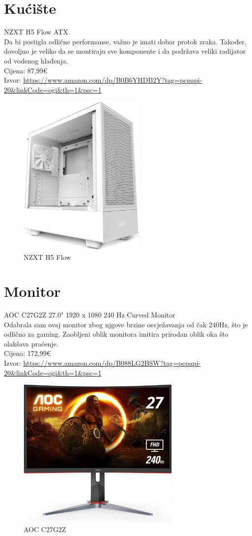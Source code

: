 \documentclass{report}
\begin{document}
\chapter{Kućište}
NZXT H5 Flow ATX
\\ Da bi postigla odlične performanse, važno je imati dobar protok zraka. Također, dovoljno je veliko da se montiraju sve komponente i da podržava veliki radijator od vodenog hlađenja.
\\Cijena: 87,99€
\\Izvor:  \url{https://www.amazon.com/dp/B0B6YHDB2Y?tag=pcpapi-20&linkCode=ogi&th=1&psc=1}
\begin{figure}[h]
\includegraphics[height=8cm]{kuciste.jpg}
\caption{NZXT H5 Flow}
\end{figure}

\chapter{Monitor}
AOC C27G2Z 27.0" 1920 x 1080 240 Hz Curved Monitor
\\Odabrala sam ovaj monitor zbog njgove brzine osvježavanja od čak 240Hz, što je odlično za gaming. Zaobljeni oblik monitora imitira prirodan oblik oka što olakšava praćenje.
\\Cijena: 172,99€
\\Izvor:  \url{https://www.amazon.com/dp/B088LG2BSW?tag=pcpapi-20&linkCode=ogi&th=1&psc=1}
\begin{figure}[h]
\includegraphics[width=8cm]{monitor.jpg}
\caption{AOC C27G2Z}
\end{figure}
\end{document}
